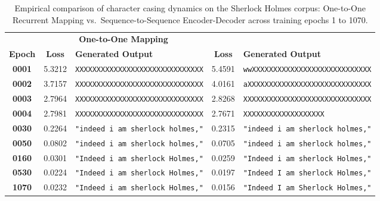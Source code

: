 \documentclass[../../main.tex]{subfiles}
\begin{document}
\begin{table}[htbp]
\centering
\footnotesize
\caption{Empirical comparison of character casing dynamics on the Sherlock Holmes corpus: One-to-One Recurrent Mapping vs.~Sequence-to-Sequence Encoder-Decoder across training epochs 1 to 1070.}
\label{tab:sherlock_seq2seq_comparison}
\begin{tabularx}{\textwidth}{@{} c c >{\raggedright\arraybackslash}X c >{\raggedright\arraybackslash}X @{}}
\toprule
& \multicolumn{2}{c}{\textbf{One-to-One Mapping}} & \multicolumn{2}{c}{\textbf{Encoder-Decoder Architecture}} \\
\cmidrule(lr){2-3} \cmidrule(lr){4-5}
\textbf{Epoch} & \textbf{Loss} & \textbf{Generated Output} & \textbf{Loss} & \textbf{Generated Output} \\
\midrule
\textbf{0001} & 5.3212 & \texttt{XXXXXXXXXXXXXXXXXXXXXXXXXXXXXX} & 5.4591 & \texttt{wwXXXXXXXXXXXXXXXXXXXXXXXXXXXX} \\
\textbf{0002} & 3.7157 & \texttt{XXXXXXXXXXXXXXXXXXXXXXXXXXXXXX} & 4.0161 & \texttt{aXXXXXXXXXXXXXXXXXXXXXXXXXXXXX} \\
\textbf{0003} & 2.7964 & \texttt{XXXXXXXXXXXXXXXXXXXXXXXXXXXXXX} & 2.8268 & \texttt{XXXXXXXXXXXXXXXXXXXXXXXXXXXXXX} \\
\textbf{0004} & 2.7981 & \texttt{XXXXXXXXXXXXXXXXXXXXXXXXXXXXXX} & 2.7671 & \texttt{XXXXXXXXXXXXXXXXXXX} \\
\midrule
\textbf{0030} & 0.2264 & \texttt{"indeed i am sherlock holmes,"} & 0.2315 & \texttt{"indeed i am sherlock holmes,"} \\
\textbf{0050} & 0.0802 & \texttt{"indeed i am sherlock holmes,"} & 0.0705 & \texttt{"indeed i am sherlock holmes,"} \\
\midrule
\textbf{0160} & 0.0301 & \texttt{"Indeed i am sherlock Holmes,"} & 0.0259 & \texttt{"Indeed i am sherlock Holmes,"} \\
\textbf{0530} & 0.0224 & \texttt{"Indeed i am sherlock Holmes,"} & 0.0197 & \texttt{"Indeed I am sherlock Holmes,"} \\
\textbf{1070} & 0.0232 & \texttt{"Indeed i am sherlock Holmes,"} & 0.0156 & \texttt{"Indeed I am Sherlock Holmes,"} \\
\bottomrule
\end{tabularx}
\end{table}
\end{document}
